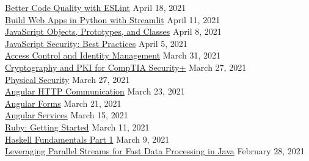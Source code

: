 \documentclass[10pt]{res} %
\begin{document}
\begin{resume}
\href{https://bjdelacruz.dev/files/certificates/pluralsight/Better_Code_Quality_with_ESLint.pdf}{\color{blue}Better Code Quality with ESLint} \hfill April 18, 2021 \\
\href{https://bjdelacruz.dev/files/certificates/pluralsight/Build_Web_Apps_in_Python_with_Streamlit.pdf}{\color{blue}Build Web Apps in Python with Streamlit} \hfill April 11, 2021 \\
\href{https://bjdelacruz.dev/files/certificates/pluralsight/JavaScript_Objects_Prototypes_and_Classes.pdf}{\color{blue}JavaScript Objects, Prototypes, and Classes} \hfill April 8, 2021 \\
\href{https://bjdelacruz.dev/files/certificates/pluralsight/JavaScript_Security_Best_Practices.pdf}{\color{blue}JavaScript Security: Best Practices} \hfill April 5, 2021 \\
\href{https://bjdelacruz.dev/files/certificates/pluralsight/Access_Control_and_Identity_Management.pdf}{\color{blue}Access Control and Identity Management} \hfill March 31, 2021 \\
\href{https://bjdelacruz.dev/files/certificates/pluralsight/Cryptography_and_PKI_for_CompTIA_Security.pdf}{\color{blue}Cryptography and PKI for CompTIA Security+} \hfill March 27, 2021 \\
\href{https://bjdelacruz.dev/files/certificates/pluralsight/Physical_Security.pdf}{\color{blue}Physical Security} \hfill March 27, 2021 \\
\href{https://bjdelacruz.dev/files/certificates/pluralsight/Angular_HTTP_Communication.pdf}{\color{blue}Angular HTTP Communication} \hfill March 23, 2021 \\
\href{https://bjdelacruz.dev/files/certificates/pluralsight/Angular_Forms.pdf}{\color{blue}Angular Forms} \hfill March 21, 2021 \\
\href{https://bjdelacruz.dev/files/certificates/pluralsight/Angular_Services.pdf}{\color{blue}Angular Services} \hfill March 15, 2021 \\
\href{https://bjdelacruz.dev/files/certificates/pluralsight/Ruby_Getting_Started.pdf}{\color{blue}Ruby: Getting Started} \hfill March 11, 2021 \\
\href{https://bjdelacruz.dev/files/certificates/pluralsight/Haskell_Fundamentals_Part_1.pdf}{\color{blue}Haskell Fundamentals Part 1} \hfill March 9, 2021 \\
\href{https://bjdelacruz.dev/files/certificates/pluralsight/Leveraging_Parallel_Streams_for_Fast_Data_Processing_in_Java.pdf}{\color{blue}Leveraging Parallel Streams for Fast Data Processing in Java} \hfill February 28, 2021 \\

\end{resume}
\end{document}
